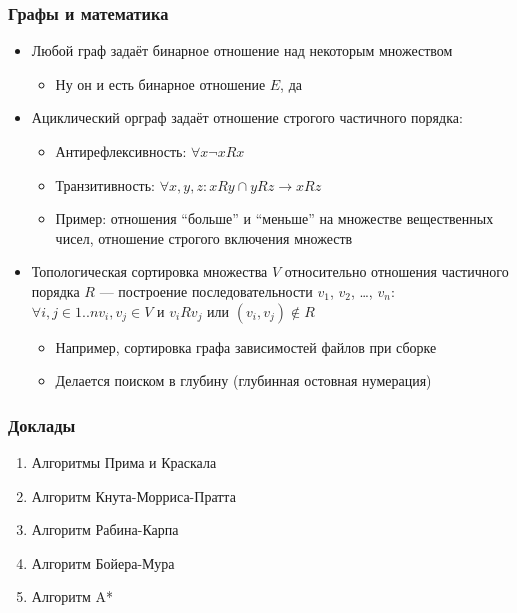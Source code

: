 \documentclass[xetex,mathserif,serif]{beamer}
\begin{document}
	\begin{frame}
		\frametitle{Графы и математика}
		\begin{itemize}
			\item Любой граф задаёт бинарное отношение над некоторым множеством
			\begin{itemize}
				\item Ну он и есть бинарное отношение $E$, да
			\end{itemize}
			\item Ациклический орграф задаёт отношение строгого частичного порядка:
			\begin{itemize}
				\item Антирефлексивность: $\forall x \neg xRx$
				\item Транзитивность: $\forall x,y,z: xRy \cap yRz \rightarrow xRz$
				\item Пример: отношения ``больше'' и ``меньше'' на множестве вещественных чисел, отношение строгого включения множеств
			\end{itemize}
			\item Топологическая сортировка множества $V$ относительно отношения частичного порядка $R$ --- построение последовательности $v_1$, $v_2$, …, $v_n$: 
			$\forall i,j \in 1..n v_i, v_j \in V$ и $v_iRv_j$ или $(v_i, v_j) \not\in R$
			\begin{itemize}
				\item Например, сортировка графа зависимостей файлов при сборке
				\item Делается поиском в глубину (глубинная остовная нумерация)
			\end{itemize}
		\end{itemize}
	\end{frame}

	\begin{frame}
		\frametitle{Доклады}
		\begin{enumerate}
			\item Алгоритмы Прима и Краскала
			\item Алгоритм Кнута-Морриса-Пратта
			\item Алгоритм Рабина-Карпа
			\item Алгоритм Бойера-Мура
			\item Алгоритм A*
		\end{enumerate}
	\end{frame}
\end{document}
